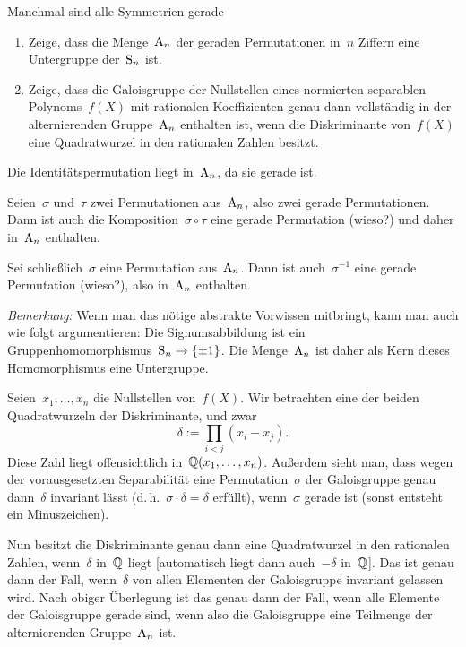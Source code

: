 \documentclass{algblatt}
\begin{document}
\begin{aufgabe}{Manchmal sind alle Symmetrien gerade}
\begin{enumerate}
\item Zeige, dass die Menge~$\mathrm{A}_n$ der geraden Permutationen in~$n$ Ziffern eine
Untergruppe der~$\mathrm{S}_n$ ist.

\item Zeige, dass die Galoisgruppe der Nullstellen eines normierten separablen
Polynoms~$f(X)$ mit rationalen Koeffizienten genau dann vollständig in der
alternierenden Gruppe~$\mathrm{A}_n$ enthalten ist, wenn die Diskriminante von~$f(X)$
eine Quadratwurzel in den rationalen Zahlen besitzt.
\end{enumerate}

\begin{loesungE}
\item Die Identitätspermutation liegt in~$\mathrm{A}_n$, da sie gerade ist.

Seien~$\sigma$ und~$\tau$ zwei Permutationen aus~$\mathrm{A}_n$, also zwei gerade
Permutationen. Dann ist auch die Komposition~$\sigma \circ \tau$ eine gerade
Permutation (wieso?) und daher in~$\mathrm{A}_n$ enthalten.

Sei schließlich~$\sigma$ eine Permutation aus~$\mathrm{A}_n$. Dann ist
auch~$\sigma^{-1}$ eine gerade Permutation (wieso?), also in~$\mathrm{A}_n$ enthalten.

\emph{Bemerkung:} Wenn man das nötige abstrakte Vorwissen mitbringt, kann man
auch wie folgt argumentieren: Die Signumsabbildung ist ein
Gruppenhomomorphismus~$\mathrm{S}_n \to \{ \pm1 \}$. Die Menge~$\mathrm{A}_n$ ist daher als Kern
dieses Homomorphismus eine Untergruppe.

\item Seien~$x_1, \ldots, x_n$ die Nullstellen von~$f(X)$. Wir betrachten eine
der beiden Quadratwurzeln der Diskriminante, und zwar
\[ \delta := \prod_{i < j} (x_i - x_j). \]
Diese Zahl liegt offensichtlich in~$\mathbb{Q}(x_1,\ldots,x_n)$. Außerdem sieht man,
dass wegen der vorausgesetzten Separabilität eine Permutation~$\sigma$ der
Galoisgruppe genau dann~$\delta$ invariant lässt (d.\,h.~$\sigma \cdot \delta =
\delta$ erfüllt), wenn~$\sigma$ gerade ist (sonst entsteht ein Minuszeichen).

Nun besitzt die Diskriminante genau dann eine Quadratwurzel in den rationalen
Zahlen, wenn~$\delta$ in~$\mathbb{Q}$ liegt [automatisch liegt dann auch~$-\delta$
in~$\mathbb{Q}$]. Das ist genau dann der Fall, wenn~$\delta$ von allen Elementen der
Galoisgruppe invariant gelassen wird. Nach obiger Überlegung ist das genau dann
der Fall, wenn alle Elemente der Galoisgruppe gerade sind, wenn also die
Galoisgruppe eine Teilmenge der alternierenden Gruppe~$\mathrm{A}_n$ ist.
\end{loesungE}
\end{aufgabe}
\end{document}
